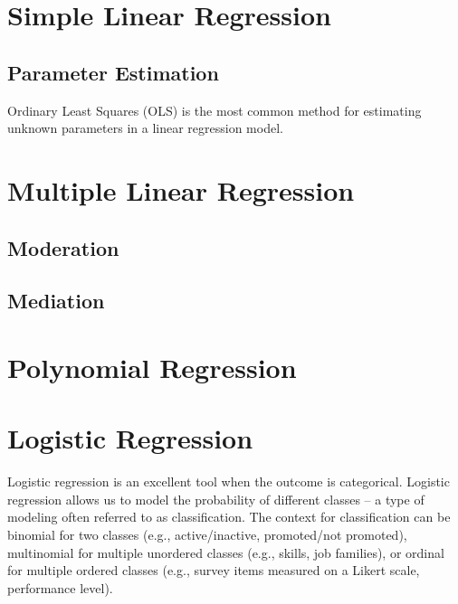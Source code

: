 \documentclass[]{book}
\begin{document}
\hypertarget{simple-linear-regression}{%
\section{Simple Linear Regression}\label{simple-linear-regression}}

\hypertarget{parameter-estimation}{%
\subsection{Parameter Estimation}\label{parameter-estimation}}

Ordinary Least Squares (OLS) is the most common method for estimating unknown parameters in a linear regression model.

\hypertarget{multiple-linear-regression}{%
\section{Multiple Linear Regression}\label{multiple-linear-regression}}

\hypertarget{moderation}{%
\subsection{Moderation}\label{moderation}}

\hypertarget{mediation}{%
\subsection{Mediation}\label{mediation}}

\hypertarget{polynomial-regression}{%
\section{Polynomial Regression}\label{polynomial-regression}}

\hypertarget{logistic-regression}{%
\section{Logistic Regression}\label{logistic-regression}}

Logistic regression is an excellent tool when the outcome is categorical. Logistic regression allows us to model the probability of different classes -- a type of modeling often referred to as classification. The context for classification can be binomial for two classes (e.g., active/inactive, promoted/not promoted), multinomial for multiple unordered classes (e.g., skills, job families), or ordinal for multiple ordered classes (e.g., survey items measured on a Likert scale, performance level).
\end{document}
